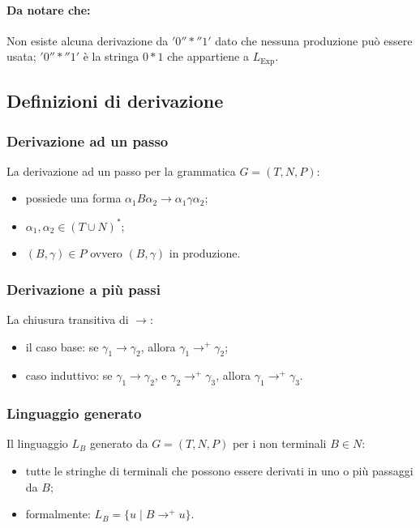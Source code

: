 \paragraph{Da notare che:}
Non esiste alcuna derivazione da $'0''*''1'$ dato che nessuna produzione può
essere usata; $'0''*''1'$ è la stringa $0*1$ che appartiene a $L_{\text{Exp}}$.

\subsection{Definizioni di derivazione}
\subsubsection{Derivazione ad un passo}
\begin{theorem}
  La derivazione ad un passo per la grammatica $G=(T,N,P)$:
  \begin{itemize}
    \item possiede una forma $\alpha_1 B\alpha_2\rightarrow\alpha_1\gamma
      \alpha_2$;
    \item $\alpha_1,\alpha_2\in(T\cup N)^*$;
    \item $(B,\gamma)\in P$ ovvero $(B,\gamma)$ in produzione.
  \end{itemize}
\end{theorem}

\subsubsection{Derivazione a più passi}
\begin{theorem}
  La chiusura transitiva di $\rightarrow$:
  \begin{itemize}
    \item il caso base: se $\gamma_1\rightarrow\gamma_2$, allora $\gamma_1
      \rightarrow^+\gamma_2$;
    \item caso induttivo: se $\gamma_1\rightarrow\gamma_2$, e $\gamma_2
      \rightarrow^+\gamma_3$, allora $\gamma_1\rightarrow^+\gamma_3$.
  \end{itemize}
\end{theorem}

\subsubsection{Linguaggio generato}
Il linguaggio $L_B$ generato da $G=(T,N,P)$ per i non terminali $B\in N$:
\begin{itemize}
  \item tutte le stringhe di terminali che possono essere derivati in uno
    o più passaggi da $B$;
  \item formalmente: $L_B=\{u\mid B\rightarrow^+ u\}$.
\end{itemize}
